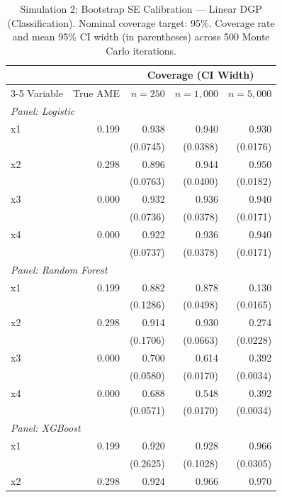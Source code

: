 \documentclass[conference]{IEEEtran}
\begin{document}
	\begin{table}[htbp]
		\centering
		\footnotesize
		\begin{threeparttable}
			\caption{Simulation 2: Bootstrap SE Calibration --- Linear DGP (Classification). Nominal coverage target: 95\%. Coverage rate and mean 95\% CI width (in parentheses) across 500 Monte Carlo iterations.}
			\label{tab:sim2_calibration_linear}
			\begin{tabular}{lrrrr}
				\toprule
				& & \multicolumn{3}{c}{Coverage (CI Width)} \\
				\cmidrule(lr){3-5}
				Variable & True AME & $n=250$ & $n=1,000$ & $n=5,000$ \\
				\midrule
				\multicolumn{5}{l}{\textit{Panel: Logistic}} \\
				\quad x1 & 0.199 & 0.938 & 0.940 & 0.930 \\
				&  & (0.0745) & (0.0388) & (0.0176) \\
				\quad x2 & 0.298 & 0.896 & 0.944 & 0.950 \\
				&  & (0.0763) & (0.0400) & (0.0182) \\
				\quad x3 & 0.000 & 0.932 & 0.936 & 0.940 \\
				&  & (0.0736) & (0.0378) & (0.0171) \\
				\quad x4 & 0.000 & 0.922 & 0.936 & 0.940 \\
				&  & (0.0737) & (0.0378) & (0.0171) \\
				\midrule
				\multicolumn{5}{l}{\textit{Panel: Random Forest}} \\
				\quad x1 & 0.199 & 0.882 & 0.878 & 0.130 \\
				&  & (0.1286) & (0.0498) & (0.0165) \\
				\quad x2 & 0.298 & 0.914 & 0.930 & 0.274 \\
				&  & (0.1706) & (0.0663) & (0.0228) \\
				\quad x3 & 0.000 & 0.700 & 0.614 & 0.392 \\
				&  & (0.0580) & (0.0170) & (0.0034) \\
				\quad x4 & 0.000 & 0.688 & 0.548 & 0.392 \\
				&  & (0.0571) & (0.0170) & (0.0034) \\
				\midrule
				\multicolumn{5}{l}{\textit{Panel: XGBoost}} \\
				\quad x1 & 0.199 & 0.920 & 0.928 & 0.966 \\
				&  & (0.2625) & (0.1028) & (0.0305) \\
				\quad x2 & 0.298 & 0.924 & 0.966 & 0.970 \\

\end{tabular}
\end{threeparttable}
\end{table}
\end{document}
